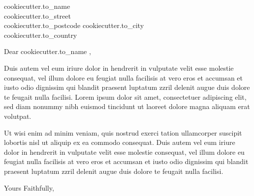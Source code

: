 \documentclass{letter}
\begin{document}
\begin{letter}{
{{ cookiecutter.to_name }} \\
{{ cookiecutter.to_street }} \\
{{ cookiecutter.to_postcode }} 
{{ cookiecutter.to_city }} \\
{{ cookiecutter.to_country }}
}

\opening{Dear {{ cookiecutter.to_name }},}

Duis autem vel eum iriure dolor in hendrerit in vulputate velit esse molestie consequat, vel illum dolore eu feugiat nulla facilisis at vero eros et accumsan et iusto odio dignissim qui blandit praesent luptatum zzril delenit augue duis dolore te feugait nulla facilisi. Lorem ipsum dolor sit amet, consectetuer adipiscing elit, sed diam nonummy nibh euismod tincidunt ut laoreet dolore magna aliquam erat volutpat.   


Ut wisi enim ad minim veniam, quis nostrud exerci tation ullamcorper suscipit lobortis nisl ut aliquip ex ea commodo consequat. Duis autem vel eum iriure dolor in hendrerit in vulputate velit esse molestie consequat, vel illum dolore eu feugiat nulla facilisis at vero eros et accumsan et iusto odio dignissim qui blandit praesent luptatum zzril delenit augue duis dolore te feugait nulla facilisi.   

\closing{Yours Faithfully,}

\end{letter}
\end{document}
